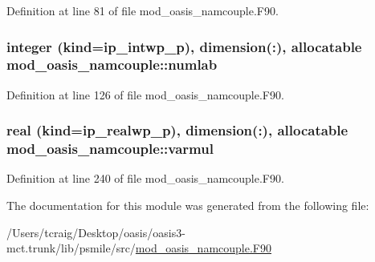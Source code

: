 Definition at line 81 of file mod\+\_\+oasis\+\_\+namcouple.\+F90.

\hypertarget{classmod__oasis__namcouple_a12e1621f5697a0cdbde11d3e25f43b54}{
\subsubsection[{numlab}]{\setlength{\rightskip}{0pt plus 5cm}integer (kind=ip\+\_\+intwp\+\_\+p), dimension(\+:), allocatable mod\+\_\+oasis\+\_\+namcouple\+::numlab\hspace{0.3cm}{\ttfamily [private]}}}\label{classmod__oasis__namcouple_a12e1621f5697a0cdbde11d3e25f43b54}


Definition at line 126 of file mod\+\_\+oasis\+\_\+namcouple.\+F90.

\hypertarget{classmod__oasis__namcouple_ab7c38fd6bd90bb8e6ebfb539ead1f1a9}{
\subsubsection[{varmul}]{\setlength{\rightskip}{0pt plus 5cm}real (kind=ip\+\_\+realwp\+\_\+p), dimension(\+:), allocatable mod\+\_\+oasis\+\_\+namcouple\+::varmul\hspace{0.3cm}{\ttfamily [private]}}}\label{classmod__oasis__namcouple_ab7c38fd6bd90bb8e6ebfb539ead1f1a9}


Definition at line 240 of file mod\+\_\+oasis\+\_\+namcouple.\+F90.



The documentation for this module was generated from the following file\+:\begin{DoxyCompactItemize}
\item 
/\+Users/tcraig/\+Desktop/oasis/oasis3-\/mct.\+trunk/lib/psmile/src/\hyperlink{mod__oasis__namcouple_8_f90}{mod\+\_\+oasis\+\_\+namcouple.\+F90}\end{DoxyCompactItemize}

